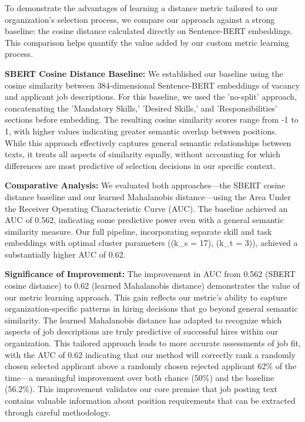 To demonstrate the advantages of learning a distance metric tailored to our organization's selection process, 
we compare our approach against a strong baseline: the cosine distance calculated directly on Sentence-BERT 
embeddings. This comparison helps quantify the value added by our custom metric learning process.

\textbf{SBERT Cosine Distance Baseline:} We established our baseline using the cosine similarity between 
384-dimensional Sentence-BERT embeddings of vacancy and applicant job descriptions. For this baseline, 
we used the 'no-split' approach, concatenating the 'Mandatory Skills,' 'Desired Skills,' and 'Responsibilities' 
sections before embedding. The resulting cosine similarity scores range from -1 to 1, with higher values 
indicating greater semantic overlap between positions. While this approach effectively captures general 
semantic relationships between texts, it treats all aspects of similarity equally, without accounting for 
which differences are most predictive of selection decisions in our specific context.

\textbf{Comparative Analysis:} We evaluated both approaches—the SBERT cosine distance baseline and our 
learned Mahalanobis distance—using the Area Under the Receiver Operating Characteristic Curve (AUC). 
The baseline achieved an AUC of 0.562, indicating some predictive power even with a general semantic 
similarity measure. Our full pipeline, incorporating separate skill and task embeddings with optimal 
cluster parameters ((k_s = 17), (k_t = 3)), achieved a substantially higher AUC of 0.62.

\textbf{Significance of Improvement:} The improvement in AUC from 0.562 (SBERT cosine distance) to 0.62 
(learned Mahalanobis distance) demonstrates the value of our metric learning approach. This gain reflects 
our metric's ability to capture organization-specific patterns in hiring decisions that go beyond general 
semantic similarity. The learned Mahalanobis distance has adapted to recognize which aspects of 
job descriptions are truly predictive of successful hires within our organization. This tailored approach 
leads to more accurate assessments of job fit, with the AUC of 0.62 indicating that our method will 
correctly rank a randomly chosen selected applicant above a randomly chosen rejected applicant 
62\% of the time—a meaningful improvement over both chance (50\%) and the baseline (56.2\%). 
This improvement validates our core premise that job posting text contains valuable information 
about position requirements that can be extracted through careful methodology.
